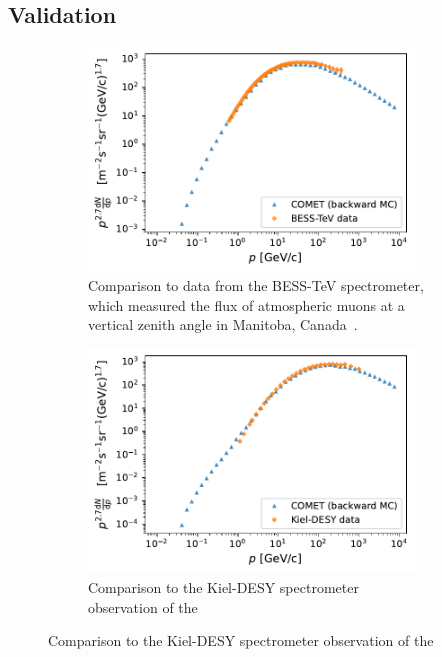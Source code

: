 \subsection{Validation}
\begin{figure}
    \centering
    \begin{subfigure}[t]{0.49\textwidth}
        \centering
        \includegraphics[width=0.95\textwidth]{chapter5/comparison_besstev.pdf}
        \caption{
            Comparison to data from the BESS-TeV spectrometer,
            which measured the flux of atmospheric muons at a vertical zenith
            angle in Manitoba, Canada~\cite{besstev}. }
    \end{subfigure}
    \hfill
    \begin{subfigure}[t]{0.49\textwidth}
        \centering
        \includegraphics[width=0.95\textwidth]{chapter5/comparison_kieldesy.pdf}
        \caption{ 
            Comparison to the Kiel-DESY spectrometer observation of the
}
\end{subfigure}
\end{figure}
